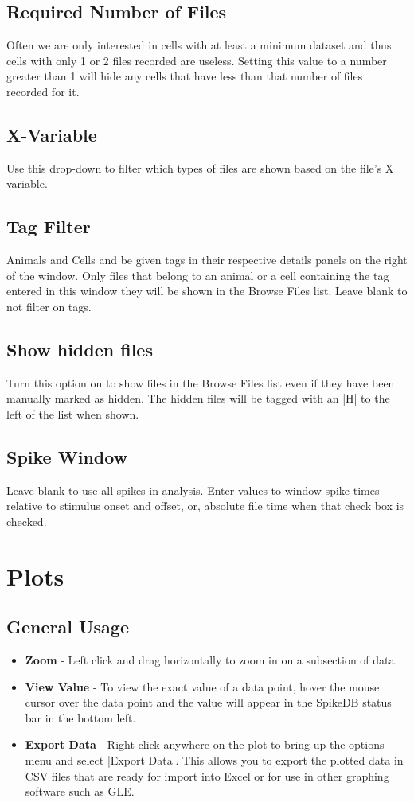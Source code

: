 \documentclass{report}
\begin{document}
\subsection{Required Number of Files}
Often we are only interested in cells with at least a minimum dataset and thus cells with only 1 or 2 files recorded are useless. Setting this value to a number greater than 1 will hide any cells that have less than that number of files recorded for it.

\subsection{X-Variable}
Use this drop-down to filter which types of files are shown based on the file's X variable.

\subsection{Tag Filter}
Animals and Cells and be given tags in their respective details panels on the right of the window. Only files that belong to an animal or a cell containing the tag entered in this window they will be shown in the Browse Files list. Leave blank to not filter on tags.

\subsection{Show hidden files}
Turn this option on to show files in the Browse Files list even if they have been manually marked as hidden. The hidden files will be tagged with an |H| to the left of the list when shown.

\subsection{Spike Window}
Leave blank to use all spikes in analysis.  Enter values to window spike times relative to stimulus onset and offset, or, absolute file time when that check box is checked.

\section{Plots}
\subsection{General Usage}
\begin{itemize}
	\item \textbf{Zoom} - Left click and drag horizontally to zoom in on a subsection of data.  
	\item \textbf{View Value} - To view the exact value of a data point, hover the mouse cursor over the data point and the value will appear in the SpikeDB status bar in the bottom left. 
	\item \textbf{Export Data} - Right click anywhere on the plot to bring up the options menu and select |Export Data|. This allows you to export the plotted data in CSV files that are ready for import into Excel or for use in other graphing software such as GLE.
\end{itemize}
\end{document}
